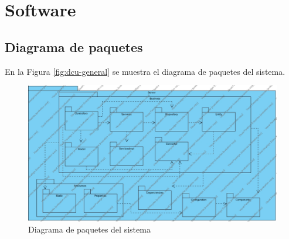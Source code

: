 \section{Software}
\subsection{Diagrama de paquetes}
En la Figura \ref{fig:dcu-general} se muestra el diagrama de paquetes del sistema.
\begin{figure}[H]
	\centering
	\includegraphics[scale=.198]{Capitulo4/images/Paquetes}
	\caption{Diagrama de paquetes del sistema}
	\label{fig:diagrama_paquetes}
\end{figure}

